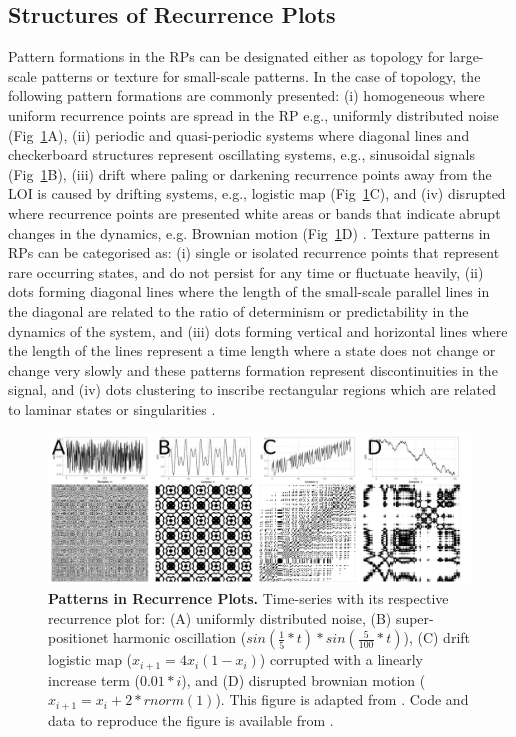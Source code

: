 \documentclass[fleqn,10pt]{wlscirep}
\begin{document}
\subsection*{Structures of Recurrence Plots}
Pattern formations in the RPs can be designated either 
as topology for large-scale patterns or texture for small-scale patterns.
In the case of topology, the following pattern formations are commonly presented:
(i) homogeneous where uniform recurrence points are spread in the RP e.g., 
uniformly distributed noise (Fig~\ref{fig:rp2}A), 
(ii) periodic and quasi-periodic systems where diagonal lines and 
checkerboard structures represent oscillating systems, e.g., sinusoidal 
signals (Fig~\ref{fig:rp2}B), 
(iii) drift where paling or darkening recurrence points away from 
the LOI is caused by drifting systems, 
e.g., logistic map (Fig~\ref{fig:rp2}C), and
(iv) disrupted where recurrence points are presented white areas or 
bands that indicate abrupt changes in the dynamics, e.g. Brownian motion 
(Fig~\ref{fig:rp2}D) \cite{eckmann1987, marwan2015}.
Texture patterns in RPs can be categorised as:
(i) single or isolated recurrence points that represent rare occurring states, 
and do not persist for any time or fluctuate heavily,
(ii) dots forming diagonal lines where the length of the small-scale parallel 
lines in the diagonal are related to the ratio of determinism or predictability 
in the dynamics of the system, and
(iii) dots forming vertical and horizontal lines where the length of the 
lines represent a time length where a state does not change or change very 
slowly and these patterns formation represent discontinuities in the signal, 
and (iv) dots clustering to inscribe rectangular regions which are related 
to laminar states or singularities \cite{marwan2015}.
\begin{figure}[ht]
\centering
\includegraphics[width=1.0\textwidth]{figures/methods/rpsp/pdf/rpsp}
    \caption{
	{\bf Patterns in Recurrence Plots.} 
	Time-series with its respective recurrence plot for:
	(A) uniformly distributed noise,
	(B) super-positionet harmonic oscillation 
	($sin( \frac{1}{5}*t) * sin( \frac{5}{100}*t) $),
	(C) drift logistic map ($x_{i+1} = 4 x_i (1- x_i) $) corrupted 
	with a linearly increase term ($0.01*i$), and
	(D) disrupted brownian motion  ($x_{i+1} = x_i + 2*rnorm(1) $).
	This figure is adapted from \cite{marwan2015}.
	Code and data to reproduce the figure is available from \cite{srep2019}.
	}
    \label{fig:rp2}
\end{figure}
\end{document}
